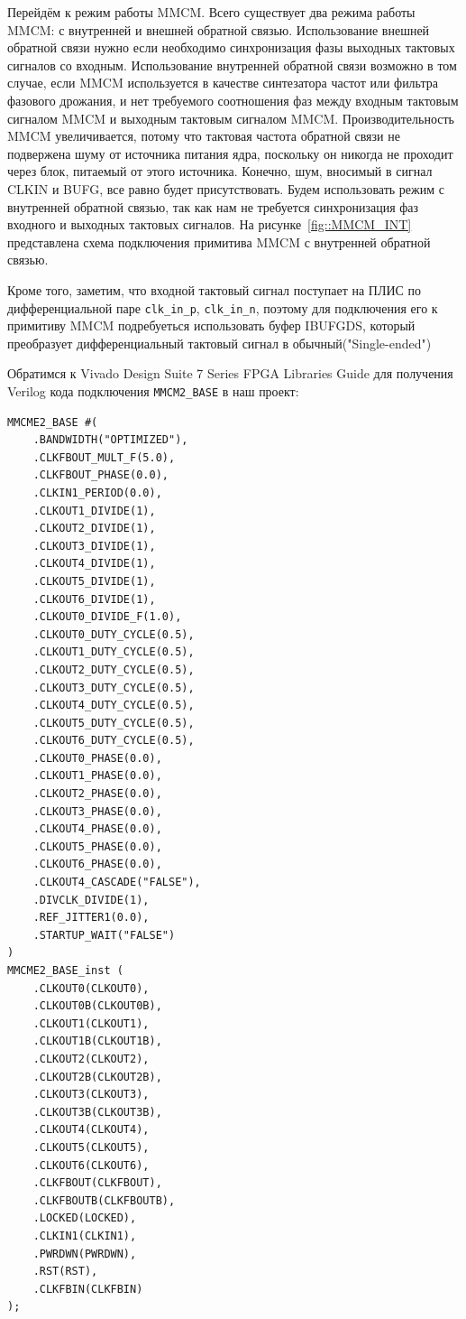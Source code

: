 \documentclass[a4paper,oneside ,14pt]{extreport}
\begin{document}
Перейдём к режим работы MMCM. Всего существует два режима работы MMCM: с внутренней и внешней обратной связью. Использование внешней обратной связи нужно если необходимо синхронизация фазы выходных тактовых сигналов со входным. Использование внутренней обратной связи возможно в том случае, если MMCM используется в качестве синтезатора частот или фильтра фазового дрожания, и нет требуемого соотношения фаз между входным тактовым сигналом MMCM и выходным тактовым сигналом MMCM. Производительность MMCM увеличивается, потому что тактовая частота обратной связи не подвержена шуму от источника питания ядра, поскольку он никогда не проходит через блок, питаемый от этого источника. Конечно, шум, вносимый в сигнал CLKIN и BUFG, все равно будет присутствовать. Будем использовать режим с внутренней обратной связью, так как нам не требуется синхронизация фаз входного и выходных тактовых сигналов. На рисунке~\ref{fig::MMCM_INT} представлена схема подключения примитива MMCM с внутренней обратной связью. 

Кроме того, заметим, что входной тактовый сигнал поступает на ПЛИС по дифференциальной паре \verb|clk_in_p|, \verb|clk_in_n|, поэтому для подключения его к примитиву MMCM подребуеться использовать буфер  IBUFGDS, который преобразует дифференциальный тактовый сигнал в обычный("Single-ended")

Обратимся к Vivado Design Suite 7 Series FPGA Libraries Guide для получения Verilog кода подключения \verb|MMCM2_BASE| в наш проект:

\begin{Verbatim}[tabsize=4]
MMCME2_BASE #(
	.BANDWIDTH("OPTIMIZED"),
	.CLKFBOUT_MULT_F(5.0),
	.CLKFBOUT_PHASE(0.0), 
	.CLKIN1_PERIOD(0.0),
	.CLKOUT1_DIVIDE(1),
	.CLKOUT2_DIVIDE(1),
	.CLKOUT3_DIVIDE(1),
	.CLKOUT4_DIVIDE(1),
	.CLKOUT5_DIVIDE(1),
	.CLKOUT6_DIVIDE(1),
	.CLKOUT0_DIVIDE_F(1.0),
	.CLKOUT0_DUTY_CYCLE(0.5),
	.CLKOUT1_DUTY_CYCLE(0.5),
	.CLKOUT2_DUTY_CYCLE(0.5),
	.CLKOUT3_DUTY_CYCLE(0.5),
	.CLKOUT4_DUTY_CYCLE(0.5),
	.CLKOUT5_DUTY_CYCLE(0.5),
	.CLKOUT6_DUTY_CYCLE(0.5),
	.CLKOUT0_PHASE(0.0),
	.CLKOUT1_PHASE(0.0),
	.CLKOUT2_PHASE(0.0),
	.CLKOUT3_PHASE(0.0),
	.CLKOUT4_PHASE(0.0),
	.CLKOUT5_PHASE(0.0),
	.CLKOUT6_PHASE(0.0),
	.CLKOUT4_CASCADE("FALSE"),
	.DIVCLK_DIVIDE(1), 
	.REF_JITTER1(0.0),
	.STARTUP_WAIT("FALSE")
)
MMCME2_BASE_inst (
	.CLKOUT0(CLKOUT0), 
	.CLKOUT0B(CLKOUT0B), 
	.CLKOUT1(CLKOUT1),
	.CLKOUT1B(CLKOUT1B), 	
	.CLKOUT2(CLKOUT2), 		
	.CLKOUT2B(CLKOUT2B), 	
	.CLKOUT3(CLKOUT3), 		
	.CLKOUT3B(CLKOUT3B), 	
	.CLKOUT4(CLKOUT4), 
	.CLKOUT5(CLKOUT5), 
	.CLKOUT6(CLKOUT6), 
	.CLKFBOUT(CLKFBOUT), 
	.CLKFBOUTB(CLKFBOUTB), 
	.LOCKED(LOCKED), 
	.CLKIN1(CLKIN1), 
	.PWRDWN(PWRDWN), 
	.RST(RST), 
	.CLKFBIN(CLKFBIN)
);

\end{Verbatim}
\end{document}
